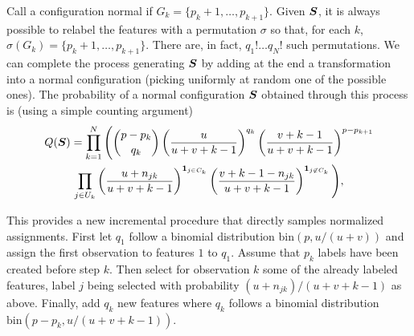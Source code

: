 Call a configuration normal if $G_k = \{p_k+1, \ldots, p_{k+1}\}$.  Given ${\bm{S}}$, it is always possible to relabel the features with a permutation $\sigma$ so that, for each $k$,  $\sigma(G_k) = \{p_k+1, \ldots, p_{k+1}\}$. There are, in fact,  $q_1! \ldots q_N!$ such permutations. We can complete the process generating ${\bm{S}}$ by adding at the end a transformation into a normal configuration (picking uniformly at random one of the possible ones). The probability of a normal configuration ${\bm{S}}$ obtained through this process is (using a simple counting argument)
 \begin{multline*}
Q({\bm{S}}) = \prod_{k=1}^N \Bigg(\binom{p-p_k}{q_k}
 \left(\frac{u}{u+v+k-1}\right)^{q_k} \left(\frac{v+k-1}{u+v+k-1}\right)^{p-p_{k+1}} \\
\prod_{j\in U_k} \left(\frac{u + n_{jk}}{u+v+k-1}\right)^{{\bm 1}_{j\in C_k}} \left(\frac{v+k-1-n_{jk}}{u+v+k-1}\right)^{{\bm 1}_{j\not\in C_k}} \Bigg),
\end{multline*}




This provides a new incremental procedure that directly samples normalized assignments. First let $q_1$ follow a binomial distribution $\mathrm{bin}(p, u/(u+v))$ and assign the first observation to features $1$ to $q_1$. Assume that $p_k$ labels have been created before step $k$. Then select for observation $k$ some of the already labeled features, label $j$ being selected with probability $(u+n_{jk})/(u+v+k-1)$ as above. Finally, add $q_k$ new features where $q_k$ follows a binomial distribution $\mathrm{bin}(p-p_k, u/(u+v+k-1))$. 

